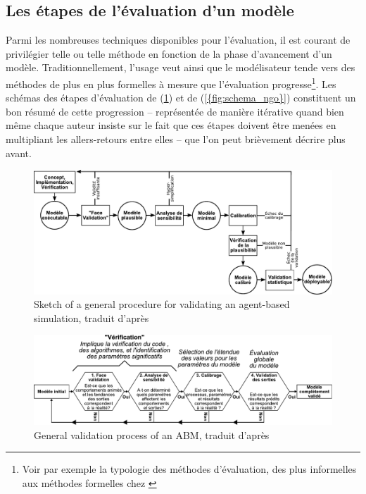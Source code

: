 \clearpage

\subsection{Les étapes de l'évaluation d'un modèle}

Parmi les nombreuses techniques disponibles pour l'évaluation, il est courant de privilégier telle ou telle méthode en fonction de la phase d'avancement d'un modèle.
Traditionnellement, l'usage veut ainsi que le modélisateur tende vers des méthodes de plus en plus formelles à mesure que l'évaluation progresse\footnote{
	Voir par exemple la typologie des méthodes d'évaluation, des plus \og informelles \fg{} aux méthodes \og formelles \fg{} chez \textcite[figure 3, p. 131]{balci_validation_1994}}.
Les schémas des étapes d'évaluation de \citeauthor{klugl_validation_2008} (\cref{fig:schema_kluegl}) et de \citeauthor{ngo_calibration_2012} (\cref{{fig:schema_ngo}}) constituent un bon résumé de cette progression -- représentée de manière itérative quand bien même chaque auteur insiste sur le fait que ces étapes doivent être menées en multipliant les allers-retours entre elles -- que l'on peut brièvement décrire plus avant.

\begin{figure}[H]
	\center
	\includegraphics[width=\linewidth]{img/schema_kluegl_traduit.pdf}
	\caption[\og Sketch of a general procedure for validating an agent-based simulation\fg{}.]{\og Sketch of a general procedure for validating an agent-based simulation\fg{}, traduit d'après \textcite[fig. 1 p. 42]{klugl_validation_2008}}
	\label{fig:schema_kluegl}
\end{figure}
\bigskip
\begin{figure}[H]
	\center
	\includegraphics[width=\linewidth]{img/schema_ngo.pdf}
	\caption[\og General validation process of an ABM\fg{}.]{\og General validation process of an ABM\fg{}, traduit d'après \textcite[fig. 10.1 p. 183]{ngo_calibration_2012}}
	\label{fig:schema_ngo}
\end{figure}


